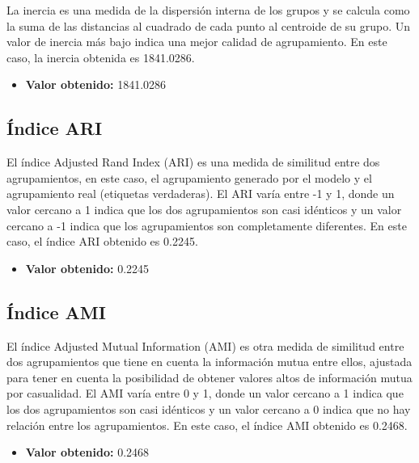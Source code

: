 \documentclass{wsdcr}
\begin{document}
La inercia es una medida de la dispersión interna de los grupos y se calcula como la suma de las distancias al cuadrado de cada punto al centroide de su grupo. Un valor de inercia más bajo indica una mejor calidad de agrupamiento. En este caso, la inercia obtenida es 1841.0286.

\begin{itemize}
    \item \textbf{Valor obtenido:} 1841.0286
\end{itemize}

\subsection{Índice ARI}

El índice Adjusted Rand Index (ARI) es una medida de similitud entre dos agrupamientos, en este caso, el agrupamiento generado por el modelo y el agrupamiento real (etiquetas verdaderas). El ARI varía entre -1 y 1, donde un valor cercano a 1 indica que los dos agrupamientos son casi idénticos y un valor cercano a -1 indica que los agrupamientos son completamente diferentes. En este caso, el índice ARI obtenido es 0.2245.

\begin{itemize}
    \item \textbf{Valor obtenido:} 0.2245
\end{itemize}

\subsection{Índice AMI}

El índice Adjusted Mutual Information (AMI) es otra medida de similitud entre dos agrupamientos que tiene en cuenta la información mutua entre ellos, ajustada para tener en cuenta la posibilidad de obtener valores altos de información mutua por casualidad. El AMI varía entre 0 y 1, donde un valor cercano a 1 indica que los dos agrupamientos son casi idénticos y un valor cercano a 0 indica que no hay relación entre los agrupamientos. En este caso, el índice AMI obtenido es 0.2468.

\begin{itemize}
    \item \textbf{Valor obtenido:} 0.2468
\end{itemize}
\end{document}
